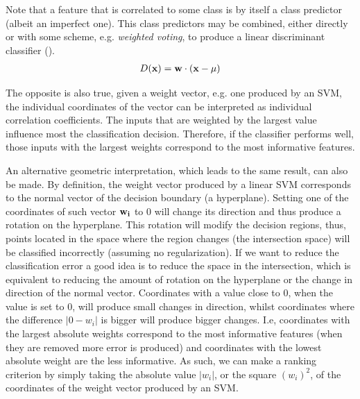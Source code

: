 Note that a feature that is correlated to some class is by itself a class predictor (albeit an imperfect one). This class predictors may be combined, either directly or with some scheme, e.g. \emph{weighted voting}, to produce a linear discriminant classifier (\cite{guyon_gene_2002}).
\begin{align*}
    D(\mathbf{x}) = \mathbf{w} \cdot (\mathbf{x} - \mu) 
\end{align*}

The opposite is also true, given a weight vector, e.g. one produced by an SVM, the individual coordinates of the vector can be interpreted as individual correlation coefficients. The inputs that are weighted by the largest value influence most the classification decision. Therefore, if the classifier performs well, those inputs with the largest weights correspond to the most informative features.

An alternative geometric interpretation, which leads to the same result, can also be made. By definition, the weight vector produced by a linear SVM corresponds to the normal vector of the decision boundary (a hyperplane). Setting one of the coordinates of such vector $\mathbf{w_i}$ to $0$ will change its direction and thus produce a rotation on the hyperplane. This rotation will modify the decision regions, thus, points located in the space where the region changes (the intersection space) will be classified incorrectly (assuming no regularization). If we want to reduce the classification error a good idea is to reduce the space in the intersection, which is equivalent to reducing the amount of rotation on the hyperplane or the change in direction of the normal vector. Coordinates with a value close to $0$, when the value is set to $0$, will produce small changes in direction, whilst coordinates where the difference $|0 - w_i|$ is bigger will produce bigger changes. I.e, coordinates with the largest absolute weights correspond to the most informative features (when they are removed more error is produced) and coordinates with the lowest absolute weight are the less informative. As such, we can make a ranking criterion by simply taking the absolute value $|w_i|$, or the square $(w_i)^2$, of the coordinates of the weight vector produced by an SVM.


